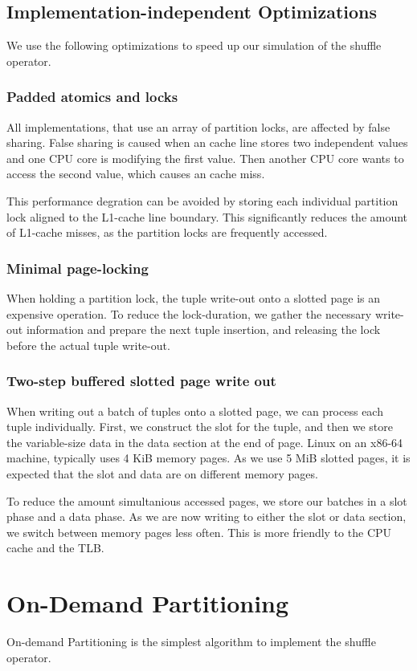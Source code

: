 \subsection{Implementation-independent Optimizations}
We use the following optimizations to speed up our simulation of the shuffle operator.
\subsubsection{Padded atomics and locks}
All implementations, that use an array of partition locks, are affected by false sharing.
False sharing is caused when an cache line stores two independent values and one \ac{CPU} core is modifying the first value.
Then another CPU core wants to access the second value, which causes an cache miss.

This performance degration can be avoided by storing each individual partition lock aligned to the L1-cache line boundary.
This significantly reduces the amount of L1-cache misses, as the partition locks are frequently accessed.

\subsubsection{Minimal page-locking}
When holding a partition lock, the tuple write-out onto a slotted page is an expensive operation.
To reduce the lock-duration, we gather the necessary write-out information and prepare the next tuple insertion, and releasing the lock before the actual tuple write-out.

\subsubsection{Two-step buffered slotted page write out}
When writing out a batch of tuples onto a slotted page, we can process each tuple individually.
First, we construct the slot for the tuple, and then we store the variable-size data in the data section at the end of page.
Linux on an x86-64 machine, typically uses 4 KiB memory pages.
As we use 5 MiB slotted pages, it is expected that the slot and data are on different memory pages.

To reduce the amount simultanious accessed pages, we store our batches in a slot phase and a data phase.
As we are now writing to either the slot or data section, we switch between memory pages less often.
This is more friendly to the \ac{CPU} cache and the \ac{TLB}.

\section{On-Demand Partitioning}
On-demand Partitioning is the simplest algorithm to implement the shuffle operator.
